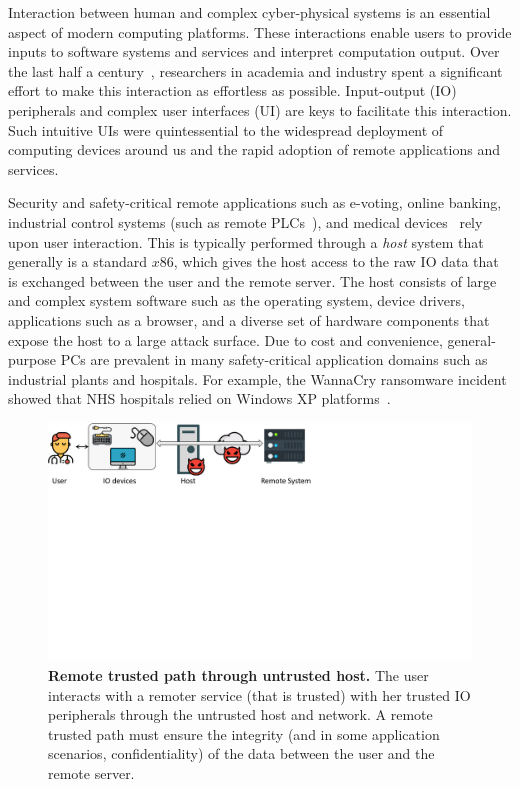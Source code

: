 Interaction between human and complex cyber-physical systems is an essential aspect of modern computing platforms. These interactions enable users to provide inputs to software systems and services and interpret computation output. Over the last half a century~\cite{hci_history_1,hci_history_2}, researchers in academia and industry spent a significant effort to make this interaction as effortless as possible. Input-output (IO) peripherals and complex user interfaces (UI) are keys to facilitate this interaction. Such intuitive UIs were quintessential to the widespread deployment of computing devices around us and the rapid adoption of remote applications and services. 

Security and safety-critical remote applications such as e-voting, online banking, industrial control systems (such as remote PLCs~\cite{controlbyweb}), and medical devices~\cite{medicalDevice} rely upon user interaction. This is typically performed through a \emph{host} system that generally is a standard $x86$, which gives the host access to the raw IO data that is exchanged between the user and the remote server. The host consists of large and complex system software such as the operating system, device drivers, applications such as a browser, and a diverse set of hardware components that expose the host to a large attack surface. Due to cost and convenience, general-purpose PCs are prevalent in many safety-critical application domains such as industrial plants and hospitals. For example, the WannaCry ransomware incident showed that NHS hospitals relied on Windows XP platforms~\cite{berry_2017,field_wannacry_2018}. 


\begin{figure}[t]
  \centering
    \includegraphics[trim={0 14cm 12cm 0},clip,width=\linewidth]{chapters/introduction/images/trustedPath.pdf}
    \caption[Remote trusted path through untrusted host]{\textbf{Remote trusted path through untrusted host.} The user interacts with a remoter service (that is trusted) with her trusted IO peripherals through the untrusted host and network. A remote trusted path must ensure the integrity (and in some application scenarios, confidentiality) of the data between the user and the remote server.}
    \label{fig:trustedPath}
\end{figure}


